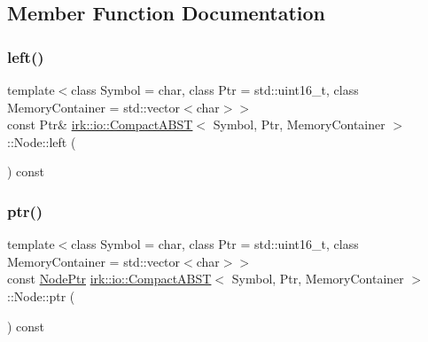 \subsection{Member Function Documentation}
\mbox{\label{structirk_1_1io_1_1CompactABST_1_1Node_a312addc207f8a0c75feb8718e05df7c3}} 
\subsubsection{\texorpdfstring{left()}{left()}}
{\footnotesize\ttfamily template$<$class Symbol = char, class Ptr = std\+::uint16\+\_\+t, class Memory\+Container = std\+::vector$<$char$>$$>$ \\
const Ptr\& \mbox{\hyperlink{classirk_1_1io_1_1CompactABST}{irk\+::io\+::\+Compact\+A\+B\+ST}}$<$ Symbol, Ptr, Memory\+Container $>$\+::Node\+::left (\begin{DoxyParamCaption}{ }\end{DoxyParamCaption}) const\hspace{0.3cm}{\ttfamily [inline]}}

\mbox{\label{structirk_1_1io_1_1CompactABST_1_1Node_a83752e75d980f93a5a1aab8832c1170e}} 
\subsubsection{\texorpdfstring{ptr()}{ptr()}}
{\footnotesize\ttfamily template$<$class Symbol = char, class Ptr = std\+::uint16\+\_\+t, class Memory\+Container = std\+::vector$<$char$>$$>$ \\
const \mbox{\hyperlink{structirk_1_1io_1_1CompactABST_1_1NodePtr}{Node\+Ptr}} \mbox{\hyperlink{classirk_1_1io_1_1CompactABST}{irk\+::io\+::\+Compact\+A\+B\+ST}}$<$ Symbol, Ptr, Memory\+Container $>$\+::Node\+::ptr (\begin{DoxyParamCaption}{ }\end{DoxyParamCaption}) const\hspace{0.3cm}{\ttfamily [inline]}}

